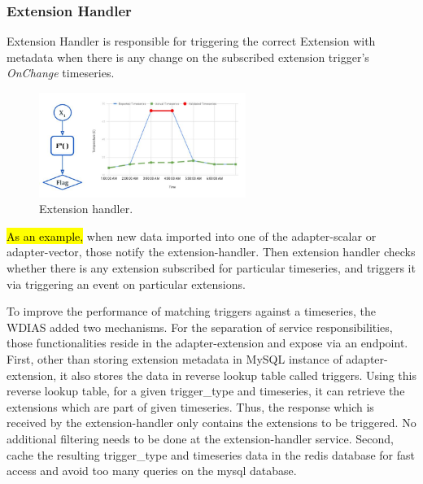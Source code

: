 \subsubsection{Extension Handler}
Extension Handler is responsible for triggering the correct Extension with metadata when there is any change on the subscribed extension trigger's \emph{OnChange} timeseries.
\begin{figure}[htp]
    \centering
    \includegraphics[width=0.6\textwidth]{method/data_preprocess/validation.jpg}
    \caption{Extension handler.}
    \label{fi:extension_handler}
\end{figure}

\hl{As an example,} when new data imported into one of the adapter-scalar or adapter-vector, those notify the extension-handler. Then extension handler checks whether there is any extension subscribed for particular timeseries, and triggers it via triggering an event on particular extensions.

To improve the performance of matching triggers against a timeseries, the WDIAS added two mechanisms. For the separation of service responsibilities, those functionalities reside in the adapter-extension and expose via an endpoint. First, other than storing extension metadata in MySQL instance of adapter-extension, it also stores the data in reverse lookup table called triggers. Using this reverse lookup table, for a given trigger\_type and timeseries, it can retrieve the extensions which are part of given timeseries. Thus, the response which is received by the 
extension-handler only contains the extensions to be triggered. No additional filtering needs to be done at the extension-handler service.
Second, cache the resulting trigger\_type and timeseries data in the \acrshort{redis} database for fast access and avoid too many queries on the \acrshort{mysql} database.

